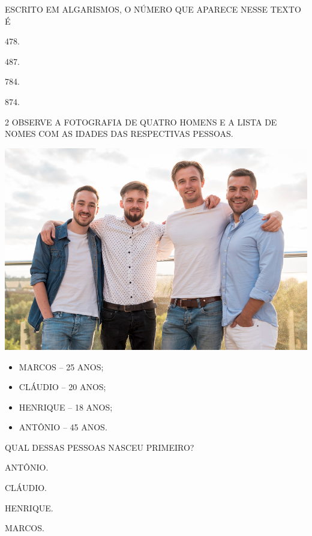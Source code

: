 ESCRITO EM ALGARISMOS, O NÚMERO QUE APARECE NESSE TEXTO É

\begin{escolha}
\item 478.

\item 487.

\item 784.

\item 874.
\end{escolha}

\num{2} OBSERVE A FOTOGRAFIA DE QUATRO HOMENS E A LISTA DE NOMES COM AS IDADES DAS RESPECTIVAS PESSOAS.

\begin{myquote}
\begin{center}
\includegraphics[width=.9\textwidth]{media/image119.png}
\end{center}

\begin{itemize}[itemsep=12pt]
  \item MARCOS -- 25 ANOS;
  \item CLÁUDIO -- 20 ANOS;
  \item HENRIQUE -- 18 ANOS;
  \item ANTÔNIO -- 45 ANOS.
\end{itemize}
\end{myquote}

QUAL DESSAS PESSOAS NASCEU PRIMEIRO?

\begin{escolha}
\item ANTÔNIO.

\item CLÁUDIO.

\item HENRIQUE.

\item MARCOS.
\end{escolha}

